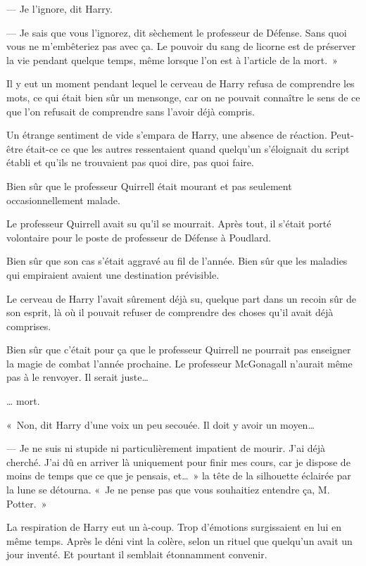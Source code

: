 --- Je l'ignore, dit Harry.

--- Je sais que vous l'ignorez, dit sèchement le professeur de Défense.
Sans quoi vous ne m'embêteriez pas avec ça.
Le pouvoir du sang de licorne est de préserver la vie pendant quelque temps, même lorsque l'on est à l'article de la mort.~»

Il y eut un moment pendant lequel le cerveau de Harry refusa de comprendre les mots, ce qui était bien sûr un mensonge, car on ne pouvait connaître le sens de ce que l'on refusait de comprendre sans l'avoir déjà compris.

Un étrange sentiment de vide s'empara de Harry, une absence de réaction.
Peut-être était-ce ce que les autres ressentaient quand quelqu'un s'éloignait du script établi et qu'ils ne trouvaient pas quoi dire, pas quoi faire.

Bien sûr que le professeur Quirrell était mourant et pas seulement occasionnellement malade.

Le professeur Quirrell avait su qu'il se mourrait.
Après tout, il s'était porté volontaire pour le poste de professeur de Défense à Poudlard.

Bien sûr que son cas s'était aggravé au fil de l'année.
Bien sûr que les maladies qui empiraient avaient une destination prévisible.

Le cerveau de Harry l'avait sûrement déjà su, quelque part dans un recoin sûr de son esprit, là où il pouvait refuser de comprendre des choses qu'il avait déjà comprises.

Bien sûr que c'était pour ça que le professeur Quirrell ne pourrait pas enseigner la magie de combat l'année prochaine.
Le professeur McGonagall n'aurait même pas à le renvoyer.
Il serait juste…

… mort.

«~Non, dit Harry d'une voix un peu secouée.
Il doit y avoir un moyen…

--- Je ne suis ni stupide ni particulièrement impatient de mourir.
J'ai déjà cherché.
J'ai dû en arriver là uniquement pour finir mes cours, car je dispose de moins de temps que ce que je pensais, et…~»
la tête de la silhouette éclairée par la lune se détourna.
«~Je ne pense pas que vous souhaitiez entendre ça, M. Potter.~»

La respiration de Harry eut un à-coup.
Trop d'émotions surgissaient en lui en même temps.
Après le déni vint la colère, selon un rituel que quelqu'un avait un jour inventé.
Et pourtant il semblait étonnamment convenir.

